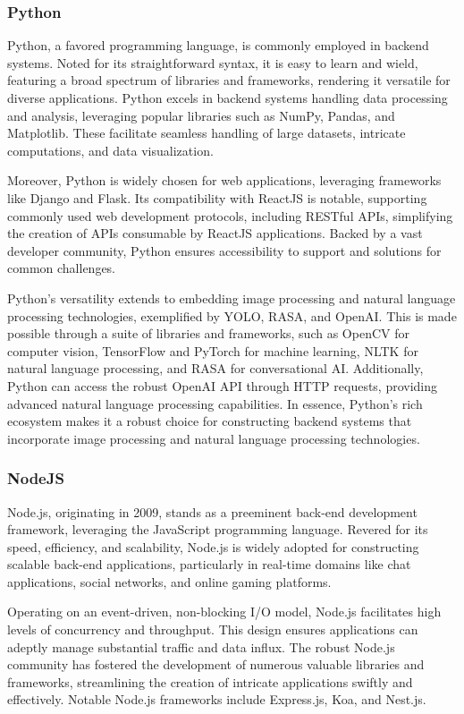 \subsubsection{Python}

Python, a favored programming language, is commonly employed in backend systems. Noted for its straightforward syntax, it is easy to learn and wield, featuring a broad spectrum of libraries and frameworks, rendering it versatile for diverse applications. Python excels in backend systems handling data processing and analysis, leveraging popular libraries such as NumPy, Pandas, and Matplotlib. These facilitate seamless handling of large datasets, intricate computations, and data visualization.

Moreover, Python is widely chosen for web applications, leveraging frameworks like Django and Flask. Its compatibility with ReactJS is notable, supporting commonly used web development protocols, including RESTful APIs, simplifying the creation of APIs consumable by ReactJS applications. Backed by a vast developer community, Python ensures accessibility to support and solutions for common challenges.

Python's versatility extends to embedding image processing and natural language processing technologies, exemplified by YOLO, RASA, and OpenAI. This is made possible through a suite of libraries and frameworks, such as OpenCV for computer vision, TensorFlow and PyTorch for machine learning, NLTK for natural language processing, and RASA for conversational AI. Additionally, Python can access the robust OpenAI API through HTTP requests, providing advanced natural language processing capabilities. In essence, Python's rich ecosystem makes it a robust choice for constructing backend systems that incorporate image processing and natural language processing technologies.

\subsubsection{NodeJS}

Node.js, originating in 2009, stands as a preeminent back-end development framework, leveraging the JavaScript programming language. Revered for its speed, efficiency, and scalability, Node.js is widely adopted for constructing scalable back-end applications, particularly in real-time domains like chat applications, social networks, and online gaming platforms.

Operating on an event-driven, non-blocking I/O model, Node.js facilitates high levels of concurrency and throughput. This design ensures applications can adeptly manage substantial traffic and data influx. The robust Node.js community has fostered the development of numerous valuable libraries and frameworks, streamlining the creation of intricate applications swiftly and effectively. Notable Node.js frameworks include Express.js, Koa, and Nest.js.

